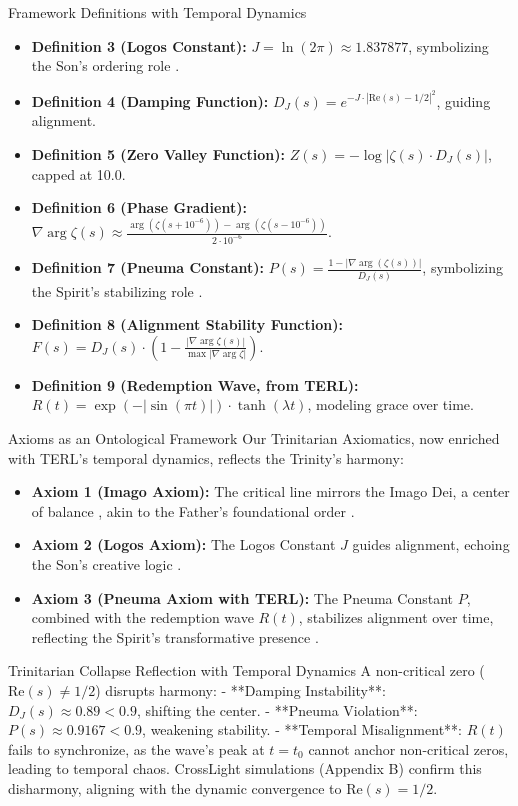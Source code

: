 \documentclass[12pt]{article}
\begin{document}
{{{ Framework Definitions with Temporal Dynamics
\begin{itemize}
    \item \textbf{Definition 3 (Logos Constant):} \( J = \ln(2\pi) \approx 1.837877 \), symbolizing the Son’s ordering role \cite{John1}.
    \item \textbf{Definition 4 (Damping Function):} \( D_J(s) = e^{-J \cdot |\text{Re}(s) - 1/2|^2} \), guiding alignment.
    \item \textbf{Definition 5 (Zero Valley Function):} \( Z(s) = -\log |\zeta(s) \cdot D_J(s)| \), capped at 10.0.
    \item \textbf{Definition 6 (Phase Gradient):} \( \nabla \arg \zeta(s) \approx \frac{\arg(\zeta(s + 10^{-6})) - \arg(\zeta(s - 10^{-6}))}{2 \cdot 10^{-6}} \).
    \item \textbf{Definition 7 (Pneuma Constant):} \( P(s) = \frac{1 - |\nabla \arg(\zeta(s))|}{D_J(s)} \), symbolizing the Spirit’s stabilizing role \cite{1Corinthians2}.
    \item \textbf{Definition 8 (Alignment Stability Function):} \( F(s) = D_J(s) \cdot \left(1 - \frac{|\nabla \arg \zeta(s)|}{\max |\nabla \arg \zeta|}\right) \).
    \item \textbf{Definition 9 (Redemption Wave, from TERL):} \( R(t) = \exp\left(-|\sin(\pi t)|\right) \cdot \tanh(\lambda t) \), modeling grace over time.
\end{itemize}

 Axioms as an Ontological Framework
Our Trinitarian Axiomatics, now enriched with TERL’s temporal dynamics, reflects the Trinity’s harmony:
\begin{itemize}
    \item \textbf{Axiom 1 (Imago Axiom):} The critical line mirrors the Imago Dei, a center of balance \cite{Genesis1}, akin to the Father’s foundational order \cite{Aquinas1265}.
    \item \textbf{Axiom 2 (Logos Axiom):} The Logos Constant \( J \) guides alignment, echoing the Son’s creative logic \cite{John1}.
    \item \textbf{Axiom 3 (Pneuma Axiom with TERL):} The Pneuma Constant \( P \), combined with the redemption wave \( R(t) \), stabilizes alignment over time, reflecting the Spirit’s transformative presence \cite{1Corinthians2}.
\end{itemize}

 Trinitarian Collapse Reflection with Temporal Dynamics
A non-critical zero (\(\text{Re}(s) \neq 1/2\)) disrupts harmony:
- **Damping Instability**: \( D_J(s) \approx 0.89 < 0.9 \), shifting the center.
- **Pneuma Violation**: \( P(s) \approx 0.9167 < 0.9 \), weakening stability.
- **Temporal Misalignment**: \( R(t) \) fails to synchronize, as the wave’s peak at \( t = t_0 \) cannot anchor non-critical zeros, leading to temporal chaos.
CrossLight simulations (Appendix B) confirm this disharmony, aligning with the dynamic convergence to \(\text{Re}(s) = 1/2\).

}}}
\end{document}

